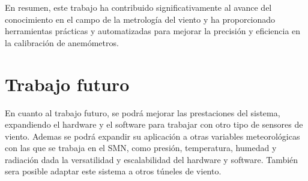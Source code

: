 En resumen, este trabajo ha contribuido significativamente al avance del conocimiento en el campo de la metrología del viento y ha proporcionado herramientas prácticas y automatizadas para mejorar la precisión y eficiencia en la calibración de anemómetros.

\section{Trabajo futuro}

En cuanto al trabajo futuro, se podrá mejorar las prestaciones del sistema, expandiendo el hardware y el software para trabajar con otro tipo de sensores de viento. Ademas se podrá expandir su aplicación a otras variables meteorológicas con las que se trabaja en el SMN, como presión, temperatura, humedad y radiación dada la versatilidad y escalabilidad del hardware y software. También sera posible adaptar este sistema a otros túneles de viento.



